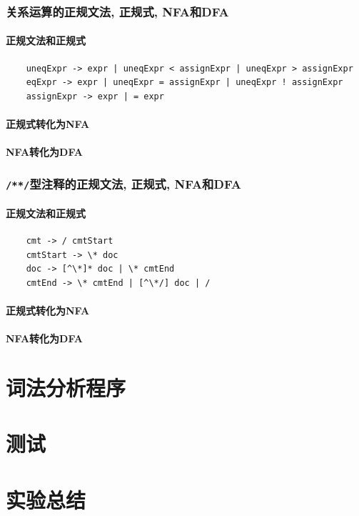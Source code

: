 \documentclass[lang=cn, a4paper]{elegantpaper}
\begin{document}
\subsubsection{关系运算的正规文法, 正规式, NFA和DFA}

\paragraph{正规文法和正规式}

\begin{lstlisting}
	uneqExpr -> expr | uneqExpr < assignExpr | uneqExpr > assignExpr
	eqExpr -> expr | uneqExpr = assignExpr | uneqExpr ! assignExpr
	assignExpr -> expr | = expr
\end{lstlisting}

\paragraph{正规式转化为NFA}

\paragraph{NFA转化为DFA}

\subsubsection{\lstinline|/**/|型注释的正规文法, 正规式, NFA和DFA}

\paragraph{正规文法和正规式}

\begin{lstlisting}
	cmt -> / cmtStart
	cmtStart -> \* doc
	doc -> [^\*]* doc | \* cmtEnd
	cmtEnd -> \* cmtEnd | [^\*/] doc | /
\end{lstlisting}

\paragraph{正规式转化为NFA}

\paragraph{NFA转化为DFA}

\section{词法分析程序}

\section{测试}

\section{实验总结}
\end{document}
